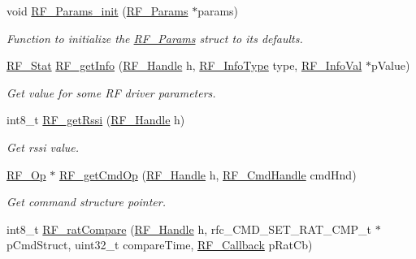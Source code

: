\begin{DoxyCompactItemize}
\begin{DoxyCompactList}
 \end{DoxyCompactList}\item 
void \hyperlink{_r_f_8h_ab956de3745437cb7a69c4edfb006434e}{R\+F\+\_\+\+Params\+\_\+init} (\hyperlink{struct_r_f___params}{R\+F\+\_\+\+Params} $\ast$params)
\begin{DoxyCompactList}\small\item\em Function to initialize the \hyperlink{struct_r_f___params}{R\+F\+\_\+\+Params} struct to its defaults. \end{DoxyCompactList}\item 
\hyperlink{_r_f_8h_afdc219ddabc8427ecd552a6c78d9988f}{R\+F\+\_\+\+Stat} \hyperlink{_r_f_8h_a4bd7985a3e0c5ad2b9f5e94aa945db63}{R\+F\+\_\+get\+Info} (\hyperlink{_r_f_8h_a5e8ab7fc87fb818f435d9b6226ee573f}{R\+F\+\_\+\+Handle} h, \hyperlink{_r_f_8h_a22596109459422a7a4d4f386dffbb8fa}{R\+F\+\_\+\+Info\+Type} type, \hyperlink{union_r_f___info_val}{R\+F\+\_\+\+Info\+Val} $\ast$p\+Value)
\begin{DoxyCompactList}\small\item\em Get value for some R\+F driver parameters. ~\newline
 \end{DoxyCompactList}\item 
int8\+\_\+t \hyperlink{_r_f_8h_ac3fe0d39243fb6bbefe0216d958a6779}{R\+F\+\_\+get\+Rssi} (\hyperlink{_r_f_8h_a5e8ab7fc87fb818f435d9b6226ee573f}{R\+F\+\_\+\+Handle} h)
\begin{DoxyCompactList}\small\item\em Get rssi value. \end{DoxyCompactList}\item 
\hyperlink{_r_f_8h_a47ea3dea78019340e8f8ceb854de5f02}{R\+F\+\_\+\+Op} $\ast$ \hyperlink{_r_f_8h_abdde833057385980d0ae1b2c844b97b7}{R\+F\+\_\+get\+Cmd\+Op} (\hyperlink{_r_f_8h_a5e8ab7fc87fb818f435d9b6226ee573f}{R\+F\+\_\+\+Handle} h, \hyperlink{_r_f_8h_acab1f56c62a9fd1ad0a91a46b6da23f1}{R\+F\+\_\+\+Cmd\+Handle} cmd\+Hnd)
\begin{DoxyCompactList}\small\item\em Get command structure pointer. \end{DoxyCompactList}\item 
int8\+\_\+t \hyperlink{_r_f_8h_a8e24e90ec802b1d85d517e2075a4d129}{R\+F\+\_\+rat\+Compare} (\hyperlink{_r_f_8h_a5e8ab7fc87fb818f435d9b6226ee573f}{R\+F\+\_\+\+Handle} h, rfc\+\_\+\+C\+M\+D\+\_\+\+S\+E\+T\+\_\+\+R\+A\+T\+\_\+\+C\+M\+P\+\_\+t $\ast$p\+Cmd\+Struct, uint32\+\_\+t compare\+Time, \hyperlink{_r_f_8h_a4d2ce6dc70b0f329dc5e249ec10c574a}{R\+F\+\_\+\+Callback} p\+Rat\+Cb)

\end{DoxyCompactItemize}
